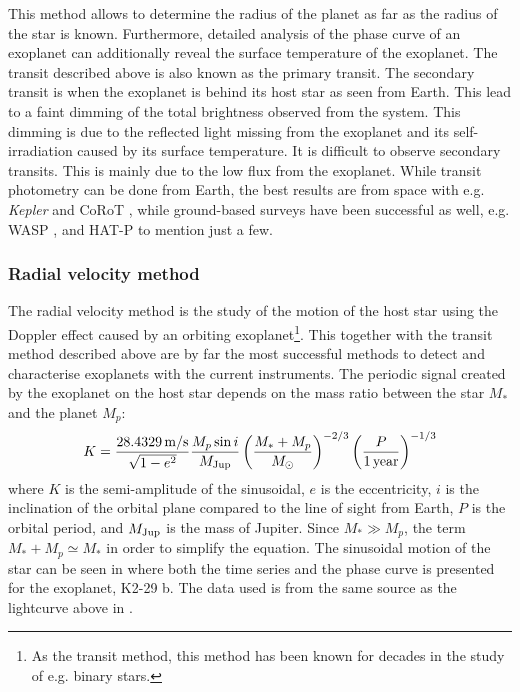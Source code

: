 This method allows to determine the radius of the planet as far as the radius of the star is known.
Furthermore, detailed analysis of the phase curve of an exoplanet can additionally reveal the
surface temperature of the exoplanet. The transit described above is also known as the primary
transit. The secondary transit is when the exoplanet is behind its host star as seen from Earth.
This lead to a faint dimming of the total brightness observed from the system. This dimming is due
to the reflected light missing from the exoplanet and its self-irradiation caused by its surface
temperature. It is difficult to observe secondary transits. This is mainly due to the low flux from
the exoplanet. While transit photometry can be done from Earth, the best results are from space with
e.g. \emph{Kepler} \citep{Borucki2010} and CoRoT \citep{Baglin2006}, while ground-based surveys have
been successful as well, e.g. WASP \citep{Pollacco2006}, and HAT-P \citep{Bakos2004} to mention
just a few.



\subsubsection{Radial velocity method}
\label{sec:rvmethod}

The radial velocity method is the study of the motion of the host star using the Doppler effect
caused by an orbiting exoplanet\footnote{As the transit method, this method has been known for
decades in the study of e.g. binary stars.}. This together with the transit method described above
are by far the most successful methods to detect and characterise exoplanets  with the current
instruments. The periodic signal created by the exoplanet on the host star depends on the mass ratio
between the star $M_\ast$ and the planet $M_p$:
\begin{align}
  K = \frac{\SI{28.4329}{m/s}}{\sqrt{1-e^2}} \frac{M_p\sin i}{M_\mathrm{Jup}} \left( \frac{M_\ast+M_p}{M_\odot} \right)^{-2/3} \left(\frac{P}{\SI{1}{year}}\right)^{-1/3}  \label{eq:rv}
\end{align}
where $K$ is the semi-amplitude of the sinusoidal, $e$ is the eccentricity, $i$ is the inclination
of the orbital plane compared to the line of sight from Earth, $P$ is the orbital period, and
$M_\mathrm{Jup}$ is the mass of Jupiter. Since $M_\ast \gg M_p$, the term $M_\ast+M_p\simeq M_\ast$ in order
to simplify the equation. The sinusoidal motion of the star can be seen in  where
both the time series and the phase curve is presented for the exoplanet, K2-29 b. The data used is
from the same source as the lightcurve above in .

